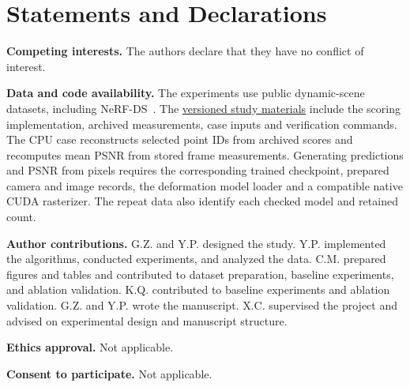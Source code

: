\documentclass[pdflatex,sn-mathphys]{sn-jnl}
\begin{document}
\section*{Statements and Declarations}
\textbf{Competing interests.} The authors declare that they have no conflict of interest.

\textbf{Data and code availability.} The experiments use public dynamic-scene datasets, including NeRF-DS~\cite{yan2023nerf}. The \href{https://github.com/leokingpan/random-budget-4dgs/tree/62f82c4c466db33753bb189b48d0cc9987ccccee/studies/source-ranking}{versioned study materials} include the scoring implementation, archived measurements, case inputs and verification commands. The CPU case reconstructs selected point IDs from archived scores and recomputes mean PSNR from stored frame measurements. Generating predictions and PSNR from pixels requires the corresponding trained checkpoint, prepared camera and image records, the deformation model loader and a compatible native CUDA rasterizer. The repeat data also identify each checked model and retained count.

\textbf{Author contributions.} G.Z. and Y.P. designed the study. Y.P. implemented the algorithms, conducted experiments, and analyzed the data. C.M. prepared figures and tables and contributed to dataset preparation, baseline experiments, and ablation validation. K.Q. contributed to baseline experiments and ablation validation. G.Z. and Y.P. wrote the manuscript. X.C. supervised the project and advised on experimental design and manuscript structure.

\textbf{Ethics approval.} Not applicable.

\textbf{Consent to participate.} Not applicable.

\clearpage
\clearpage
\FloatBarrier

\end{document}
